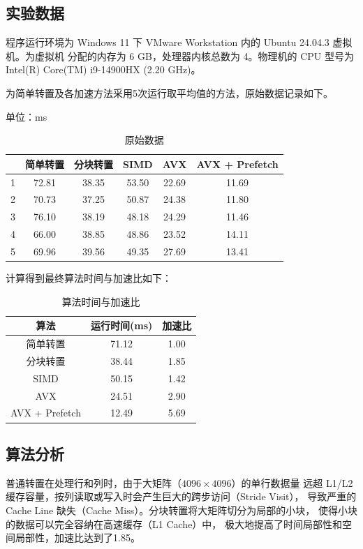 \documentclass[11pt]{article}
\begin{document}
\subsection{实验数据}
程序运行环境为 Windows 11 下 VMware Workstation 内的 Ubuntu 24.04.3 虚拟机。为虚拟机
分配的内存为 6 GB，处理器内核总数为 4。物理机的 CPU 型号为 Intel(R) Core(TM) i9-14900HX (2.20 GHz)。

为简单转置及各加速方法采用5次运行取平均值的方法，原始数据记录如下。
\begin{table}[H]
    \centering
    单位：ms \\
    \begin{tabular}{|c|c|c|c|c|c|}\hline
         & 简单转置 & 分块转置 & SIMD & AVX & AVX + Prefetch \\ \hline
        1 & 72.81 & 38.35 & 53.50 & 22.69 & 11.69 \\ \hline
        2 & 70.73 & 37.25 & 50.87 & 24.38 & 11.80 \\ \hline
        3 & 76.10 & 38.19 & 48.18 & 24.29 & 11.46 \\ \hline
        4 & 66.00 & 38.85 & 48.86 & 23.52 & 14.11 \\ \hline
        5 & 69.96 & 39.56 & 49.35 & 27.69 & 13.41 \\ \hline
    \end{tabular}
    \caption{原始数据}
\end{table}

计算得到最终算法时间与加速比如下：
\begin{table}[H]
    \centering
    \begin{tabular}{ccc}\hline
        算法 & 运行时间(ms) & 加速比 \\ \hline
        简单转置 & 71.12 & 1.00 \\
        分块转置 & 38.44 & 1.85 \\
        SIMD & 50.15 & 1.42 \\
        AVX & 24.51 & 2.90 \\
        AVX + Prefetch & 12.49 & 5.69 \\ \hline
    \end{tabular}
    \caption{算法时间与加速比}
\end{table}

\subsection{算法分析}
普通转置在处理行和列时，由于大矩阵（$4096 \times 4096$）的单行数据量
远超 L1/L2 缓存容量，按列读取或写入时会产生巨大的跨步访问（Stride Visit），
导致严重的 Cache Line 缺失（Cache Miss）。分块转置将大矩阵切分为局部的小块，
使得小块的数据可以完全容纳在高速缓存（L1 Cache）中，
极大地提高了时间局部性和空间局部性，加速比达到了1.85。
\end{document}

